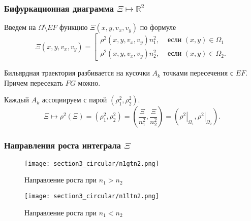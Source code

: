 \begin{frame}\frametitle{Бифуркационная диаграмма $\Xi \mapsto \mathbb{R}^2$}
Введем на $\Omega \setminus EF$ функцию $\Xi(x, y, v_x, v_y)$ по формуле
\begin{equation*}
\Xi(x, y, v_x, v_y) = \left[
\begin{array}{ll}
    \rho^2(x,y,v_x,v_y) n_1^2, &  \text{ если } (x,y) \in \Omega_1 \\
    \rho^2(x,y,v_x,v_y) n_2^2, & \text{ если } (x,y) \in \Omega_2.
\end{array}
\right.
\end{equation*}

\qq Бильярдная траектория разбивается на кусочки $A_k$ точками пересечения с $EF$. Причем пересекать $FG$ можно.

\qq Каждый $A_k$ ассоциируем с парой $(\rho_1^2, \rho_2^2)$.
\begin{equation*}
\Xi \mapsto \rho^2(\Xi) = (\rho_1^2, \rho_2^2) = \left( \frac{\Xi}{n_1^2}, \frac{\Xi}{n_2^2} \right) = \left( \left. \rho^2 \right|_{\Omega_1} ,  \left. \rho^2 \right|_{\Omega_2}  \right).
\end{equation*}
\end{frame}

\begin{frame}\frametitle{Направления роста интеграла $\Xi$}
\begin{figure}[!htb]
\centering
\texttt{[image: section3\_circular/n1gtn2.png]}
    \caption{Направление роста при $n_1 > n_2$}
    \label{fig:sect2_atom_3_step}
\endminipage\hfill
{}
\centering
\texttt{[image: section3\_circular/n1ltn2.png]}
    \caption{Направление роста при $n_1 < n_2$}
    \label{fig:sect2_atom_3}
\endminipage\hfill
\end{figure}

\end{frame}


